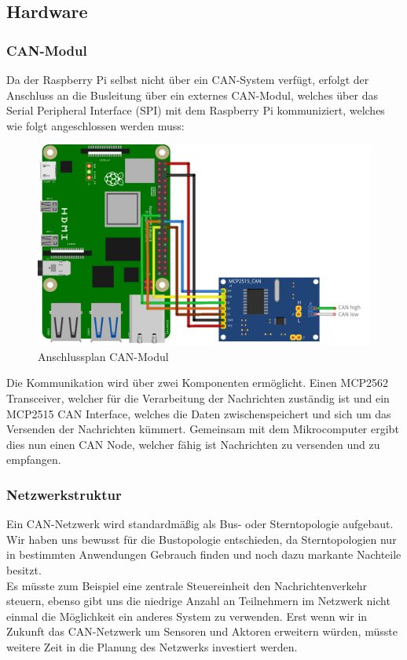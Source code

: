 \subsection{Hardware}

\subsubsection{CAN-Modul}

Da der Raspberry Pi selbst nicht über ein CAN-System verfügt, erfolgt der Anschluss an die Busleitung über ein externes CAN-Modul, welches über das Serial Peripheral Interface (SPI) mit dem Raspberry Pi kommuniziert, welches wie folgt angeschlossen werden muss: 

\begin{figure}[H]
	\begin{center}
		\includegraphics[scale=0.9]{figures/hcis/can_module.png}
		\caption{Anschlussplan CAN-Modul}
	\end{center}
\end{figure}

Die Kommunikation wird über zwei Komponenten ermöglicht. Einen MCP2562 Transceiver, welcher für die Verarbeitung der Nachrichten zuständig ist und ein MCP2515 CAN Interface, welches die Daten zwischenspeichert und sich um das Versenden der Nachrichten kümmert. Gemeinsam mit dem Mikrocomputer ergibt dies nun einen CAN Node, welcher fähig ist Nachrichten zu versenden und zu empfangen.

\subsubsection{Netzwerkstruktur}

Ein CAN-Netzwerk wird standardmäßig als Bus- oder Sterntopologie aufgebaut. Wir haben uns bewusst für die Bustopologie entschieden, da Sterntopologien nur in bestimmten Anwendungen Gebrauch finden und noch dazu markante Nachteile besitzt.\\ Es müsste zum Beispiel eine zentrale Steuereinheit den Nachrichtenverkehr steuern, ebenso gibt uns die niedrige Anzahl an Teilnehmern im Netzwerk nicht einmal die Möglichkeit ein anderes System zu verwenden. Erst wenn wir in Zukunft das CAN-Netzwerk um Sensoren und Aktoren erweitern würden, müsste weitere Zeit in die Planung des Netzwerks investiert werden. 

